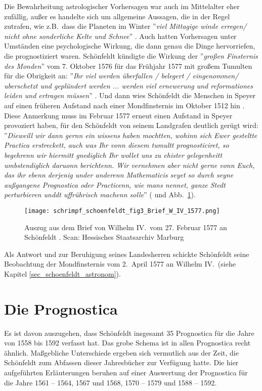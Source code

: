 \documentclass[12pt]{article}
\begin{document}
Die Bewahrheitung astrologischer Vorhersagen war auch im Mittelalter eher zufällig, außer es handelte sich um allgemeine Aussagen, die in der Regel zutrafen, wie z.B.\ dass die Planeten im Winter ''\emph{viel Mittagige winde erregen/ nicht ohne sonderliche Kelte und Schnee}'' \cite{Schoenfeldt1562}.
Auch hatten Vorhersagen unter Umständen eine psychologische Wirkung, die dann genau die Dinge hervorriefen, die prognostiziert waren. Schönfeldt kündigte die Wirkung der ''\emph{großen Finsternis des Monden}'' vom 7. Oktober 1576 für das Frühjahr 1577 mit großem Tumulten für die Obrigkeit an: ''\emph{Ihr viel werden überfallen / belegert / eingenommen/ uberschetzt und geplündert werden ... werden viel ernewerung und reformationes leiden und ertragen müssen}'' \cite{Schoenfeldt1577a}. Und dann wies Schönfeldt die Menschen in Speyer auf einen früheren Aufstand nach einer Mondfinsternis im Oktober 1512 hin \cite{Schoenfeldt1577a}. Diese Anmerkung muss im Februar 1577 erneut einen Aufstand in Speyer provoziert haben, für den Schönfeldt von seinem Landgrafen deutlich gerügt wird: ''\emph{Dieweill wir dann gernn ein wissens haben mochtten, wohinn sich Ewer gesteltte Practica erstreckett, auch was Ihr vonn diesem tumultt prognosticiret, so begehrenn wir hiermitt gnediglich Ihr wollet uns zu ehister gelegenheitt umbstendiglich daruonn berichtenn. Wir vernehmen aber nicht gerne vonn Euch, das ihr ebenn derjenig under anderenn Mathematicis seyet so durch seyne außgangene Prognostica oder Practicenn, wie mans nennet, ganze Stedt perturbieren unddt uffrührisch machenn solle}'' (\cite{Wilhelm1577} und Abb.\ \ref{fig_brief_w_iv_1577}).


\begin{figure}[H]
		\begin{center}
		\texttt{[image: schrimpf\_schoenfeldt\_fig3\_Brief\_W\_IV\_1577.png]}
		\caption{Auszug aus dem Brief von Wilhelm IV.\ vom 27. Februar 1577 an Schönfeldt \cite{Wilhelm1577}. Scan: Hessisches Staatsarchiv Marburg}
		\label{fig_brief_w_iv_1577}		
	\end{center}
\end{figure}

Als Antwort und zur Beruhigung seines Landesherren schickte Schönfeldt seine Beobachtung der Mondfinsternis vom 2.\ April 1577 an Wilhelm IV.\ (siehe Kapitel \ref{sec_schoenfeldt_astronom}).


\section{Die Prognostica}
Es ist davon auszugehen, dass Schönfeldt insgesamt 35 Prognostica für die Jahre von 1558 bis 1592 verfasst hat. Das grobe Schema ist in allen Prognostica recht ähnlich. Maßgebliche Unterschiede ergeben sich vermutlich aus der Zeit, die Schönfeldt zum Abfassen dieser Jahresbücher zur Verfügung hatte. Die hier aufgeführten Erläuterungen beruhen auf einer Auswertung der Prognostica für die Jahre 1561 -- 1564, 1567 und 1568, 1570 -- 1579 und 1588 -- 1592.
\end{document}
